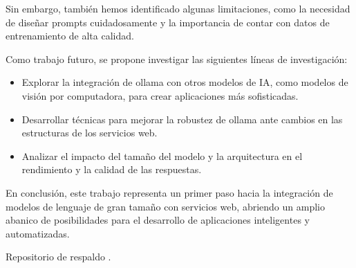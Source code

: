 \documentclass[10pt]{article}
\begin{document}
Sin embargo, también hemos identificado algunas limitaciones, como la necesidad de diseñar prompts cuidadosamente y la importancia de contar con datos de entrenamiento de alta calidad.

Como trabajo futuro, se propone investigar las siguientes líneas de investigación:

\begin{itemize}
    \item Explorar la integración de ollama con otros modelos de IA, como modelos de visión por computadora, para crear aplicaciones más sofisticadas.
    \item Desarrollar técnicas para mejorar la robustez de ollama ante cambios en las estructuras de los servicios web.
    \item Analizar el impacto del tamaño del modelo y la arquitectura en el rendimiento y la calidad de las respuestas.
\end{itemize}

En conclusión, este trabajo representa un primer paso hacia la integración de modelos de lenguaje de gran tamaño con servicios web, abriendo un amplio abanico de posibilidades para el desarrollo de aplicaciones inteligentes y automatizadas.

Repositorio de respaldo .
\end{document}
